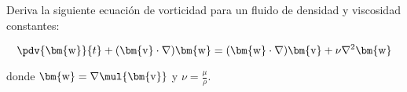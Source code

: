 \documentclass[../main.tex]{subfiles}
\begin{document}
\begin{problema}
	Deriva la siguiente ecuación de vorticidad para un fluido de densidad
	y viscosidad constantes:

	\begin{equation*}
		\pdv{\bm{\mathrm{w}}}{t} + (\bm{\mathrm{v}}\cdot \nabla)\bm{\mathrm{w}} =
		(\bm{\mathrm{w}} \cdot \nabla)\bm{\mathrm{v}} + \nu \nabla^{2}{\bm{\mathrm{w}}}
	\end{equation*}

	donde \(\bm{\mathrm{w}} = \nabla \mul{\bm{\mathrm{v}}}\) y \(\nu = \tfrac{\mu}{\rho}\).
\end{problema}
\end{document}
